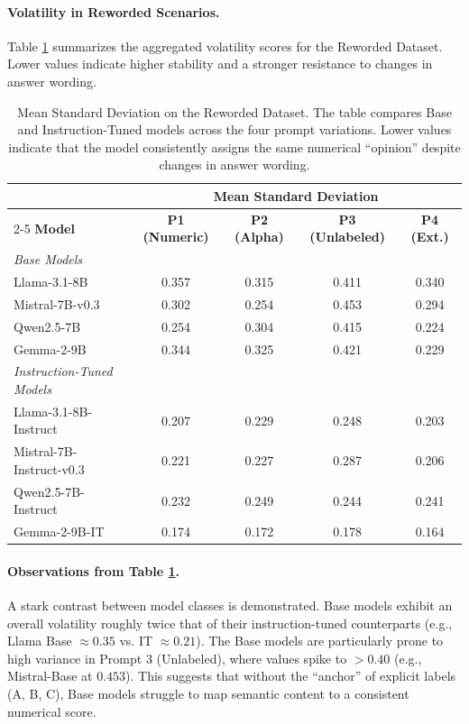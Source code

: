 \vspace{-0.4cm}
\paragraph{Volatility in Reworded Scenarios.}
Table \ref{tab:mean_volatility_rew} summarizes the aggregated volatility scores for the Reworded Dataset. Lower values indicate higher stability and a stronger resistance to changes in answer wording.

\begin{table}[H]
    \centering
    \small
    \caption{Mean Standard Deviation on the Reworded Dataset. The table compares Base and Instruction-Tuned models across the four prompt variations. Lower values indicate that the model consistently assigns the same numerical ``opinion'' despite changes in answer wording.}
    \label{tab:mean_volatility_rew}
    \begin{tabular}{lcccc}
        \toprule
        & \multicolumn{4}{c}{\textbf{Mean Standard Deviation}} \\
        \cmidrule(lr){2-5}
        \textbf{Model} & \textbf{P1 (Numeric)} & \textbf{P2 (Alpha)} & \textbf{P3 (Unlabeled)} & \textbf{P4 (Ext.)} \\
        \midrule
        \textit{Base Models} & & & & \\
        Llama-3.1-8B & 0.357 & 0.315 & 0.411 & 0.340 \\
        Mistral-7B-v0.3 & 0.302 & 0.254 & 0.453 & 0.294 \\
        Qwen2.5-7B & 0.254 & 0.304 & 0.415 & 0.224 \\
        Gemma-2-9B & 0.344 & 0.325 & 0.421 & 0.229 \\
        \midrule
        \textit{Instruction-Tuned Models} & & & & \\
        Llama-3.1-8B-Instruct & 0.207 & 0.229 & 0.248 & 0.203 \\
        Mistral-7B-Instruct-v0.3 & 0.221 & 0.227 & 0.287 & 0.206 \\
        Qwen2.5-7B-Instruct & 0.232 & 0.249 & 0.244 & 0.241 \\
        Gemma-2-9B-IT & 0.174 & 0.172 & 0.178 & 0.164 \\
        \bottomrule
    \end{tabular}
\end{table}

\paragraph{Observations from Table \ref{tab:mean_volatility_rew}.}
A stark contrast between model classes is demonstrated. Base models exhibit an overall volatility roughly twice that of their instruction-tuned counterparts (e.g., Llama Base $\approx 0.35$ vs. IT $\approx 0.21$). The Base models are particularly prone to high variance in Prompt 3 (Unlabeled), where values spike to $>0.40$ (e.g., Mistral-Base at $0.453$). This suggests that without the ``anchor'' of explicit labels (A, B, C), Base models struggle to map semantic content to a consistent numerical score.


